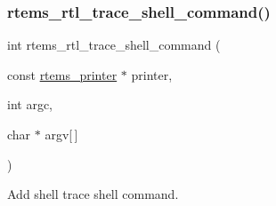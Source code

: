 \subsubsection{\texorpdfstring{rtems\_rtl\_trace\_shell\_command()}{rtems\_rtl\_trace\_shell\_command()}}
{\footnotesize\ttfamily int rtems\+\_\+rtl\+\_\+trace\+\_\+shell\+\_\+command (\begin{DoxyParamCaption}\item[{const \mbox{\hyperlink{structrtems__printer}{rtems\+\_\+printer}} $\ast$}]{printer,  }\item[{int}]{argc,  }\item[{char $\ast$}]{argv\mbox{[}$\,$\mbox{]} }\end{DoxyParamCaption})}

Add shell trace shell command. 